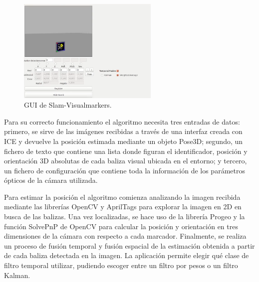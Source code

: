 \begin{figure}[H]
	\begin{center}
		\includegraphics[width=0.6\textwidth]{imag/IMG24.png}
				\caption{GUI de Slam-Visualmarkers.} 
	\label{fig:GUI de Slam-Visualmarkers.}	
	\end{center}
\end{figure}


\hspace{1cm} Para su correcto funcionamiento el algoritmo necesita tres entradas de datos: primero, se sirve de las imágenes recibidas a través de una interfaz creada con ICE y devuelve la posición estimada mediante un objeto Pose3D; segundo, un fichero de texto que contiene una lista donde figuran el identificador, posición y orientación 3D absolutas de cada baliza visual ubicada en el entorno; y tercero, un fichero de configuración que contiene toda la información de los parámetros ópticos de la cámara utilizada. 

\hspace{1cm} Para estimar la posición el algoritmo comienza analizando la imagen recibida mediante las librerías OpenCV y AprilTags para explorar la imagen en 2D en busca de las balizas. Una vez localizadas, se hace uso de la librería Progeo y la función SolvePnP de OpenCV para calcular la posición y orientación en tres dimensiones de la cámara con respecto a cada marcador. Finalmente, se realiza un proceso de fusión temporal y fusión espacial de la estimación obtenida a partir de cada baliza detectada en la imagen. La aplicación permite elegir qué clase de filtro temporal utilizar, pudiendo escoger entre un filtro por pesos o un filtro Kalman.

